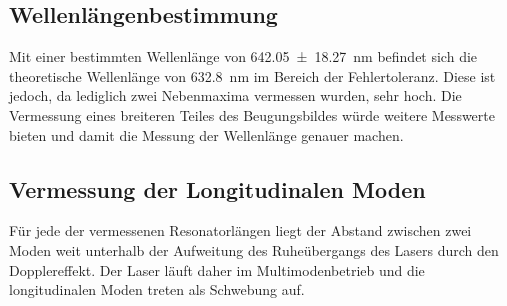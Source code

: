 \subsection{Wellenlängenbestimmung}
Mit einer bestimmten Wellenlänge von \SI{642.05(1827)}{\nm} befindet sich die
theoretische Wellenlänge von \SI{632.8}{\nm}\cite{anleitung} im Bereich der
Fehlertoleranz. Diese ist jedoch, da lediglich zwei Nebenmaxima vermessen wurden,
sehr hoch. Die Vermessung eines breiteren Teiles des Beugungsbildes würde
weitere Messwerte bieten und damit die Messung der Wellenlänge genauer machen.

\subsection{Vermessung der Longitudinalen Moden}
Für jede der vermessenen Resonatorlängen liegt der Abstand zwischen zwei Moden
weit unterhalb der Aufweitung des Ruheübergangs des Lasers durch den Dopplereffekt.
Der Laser läuft daher im Multimodenbetrieb und die longitudinalen Moden
treten als Schwebung auf.
